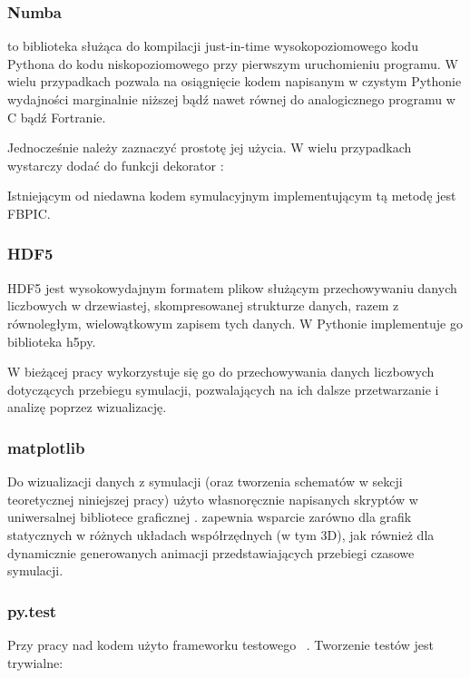 \subsubsection{Numba}
 to biblioteka służąca do kompilacji just-in-time wysokopoziomowego
kodu Pythona do kodu niskopoziomowego przy pierwszym uruchomieniu programu. W
wielu przypadkach pozwala na osiągnięcie kodem napisanym w czystym Pythonie
wydajności marginalnie niższej bądź nawet równej do analogicznego programu w C
bądź Fortranie. \cite{numba}

Jednocześnie należy zaznaczyć prostotę jej użycia. W wielu przypadkach wystarczy
dodać do funkcji dekorator :




Istniejącym od niedawna kodem symulacyjnym implementującym tą metodę jest FBPIC\cite{fbpic}.


\subsubsection{HDF5}
HDF5 jest wysokowydajnym formatem plikow służącym przechowywaniu danych
liczbowych w drzewiastej, skompresowanej strukturze danych, razem z
równoległym, wielowątkowym zapisem tych danych.  W Pythonie implementuje go
biblioteka h5py\cite{h5py}.

W bieżącej pracy wykorzystuje się go do przechowywania danych liczbowych
dotyczących przebiegu symulacji, pozwalających na ich dalsze przetwarzanie
i analizę poprzez wizualizację.

\subsubsection{matplotlib}
Do wizualizacji danych z symulacji (oraz tworzenia schematów w sekcji
teoretycznej niniejszej pracy) użyto własnoręcznie napisanych skryptów w
uniwersalnej bibliotece graficznej \cite{matplotlib}.
 zapewnia wsparcie zarówno dla grafik statycznych w różnych układach
współrzędnych (w tym 3D), jak również dla dynamicznie generowanych animacji
przedstawiających przebiegi czasowe symulacji.

\subsubsection{py.test}
Przy pracy nad kodem użyto frameworku testowego ~\cite{pytest}.
Tworzenie testów jest trywialne:

